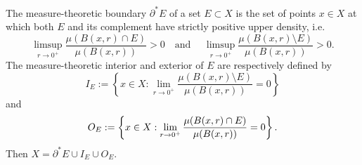 \documentclass[11pt,leqno]{amsart}
\numberwithin{equation}{section}
\theoremstyle{definition}
\begin{document}
	
	The measure-theoretic boundary $\partial^*E$ of a set $E\subset X$ is the set of points $x\in X$ at which both $E$ and its complement have strictly positive upper density, i.e.
	\begin{equation}\label{eq2.19-2011}
		\limsup_{r\to 0^+} \frac{\mu(B(x,r)\cap E)}{\mu(B(x,r))}>0 \quad \text{and }\quad 
		\limsup_{r\to 0^+} \frac{\mu(B(x,r)\setminus E)}{\mu(B(x,r))}>0.
	\end{equation}
	The measure-theoretic interior and exterior of $E$ are respectively defined  by
	\begin{equation}\label{eq2.20-2011}
		I_E:=\left\{x\in X:\lim_{r\to 0^+} \frac{\mu(B(x,r)\setminus E)}{\mu(B(x,r))}=0 \right\}
	\end{equation}
	and
	\begin{equation}\notag
		O_E:=\left\{x\in X:\lim_{r\to 0^+} \frac{\mu(B(x,r)\cap E)}{\mu(B(x,r))}=0 \right\}.
	\end{equation}
	Then  $X=\partial^*E \cup I_E\cup O_E$.
	
\end{document}

